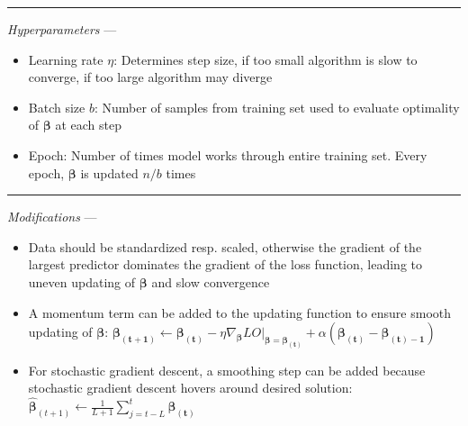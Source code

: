 {\color{lightgray}\hrule height 0.001mm}

\emph{Hyperparameters} ---
\begin{itemize}
    \item Learning rate $\eta$: Determines step size, if too small algorithm is slow to converge, if too large algorithm may diverge
    \item Batch size $b$: Number of samples from training set used to evaluate optimality of $\boldsymbol{\beta}$ at each step
    \item Epoch: Number of times model works through entire training set. Every epoch, $\boldsymbol{\beta}$ is updated $n/b$ times
\end{itemize}

{\color{lightgray}\hrule height 0.001mm}

\emph{Modifications} ---
\begin{itemize}
    \item Data should be standardized resp. scaled, otherwise the gradient of the largest predictor dominates the gradient of the loss function, leading to uneven updating of $\boldsymbol{\beta}$ and slow convergence
    \item A momentum term can be added to the updating function to ensure smooth updating of $\boldsymbol{\beta}$: $\boldsymbol{\beta_{(t+1)}} \leftarrow \boldsymbol{\beta_{(t)}} - \eta \nabla_{\boldsymbol{\beta}} LO |_{\boldsymbol{\beta} = \boldsymbol{\beta_{(t)}}} + \alpha(\boldsymbol{\beta_{(t)}} - \boldsymbol{\beta_{(t)-1}})$
    \item For stochastic gradient descent, a smoothing step can be added because stochastic gradient descent hovers around desired solution: $\hat{\boldsymbol{\beta}}_{(t+1)} \leftarrow \frac{1}{L+1} \sum_{j=t-L}^t \boldsymbol{\beta_{(t)}}$
\end{itemize}